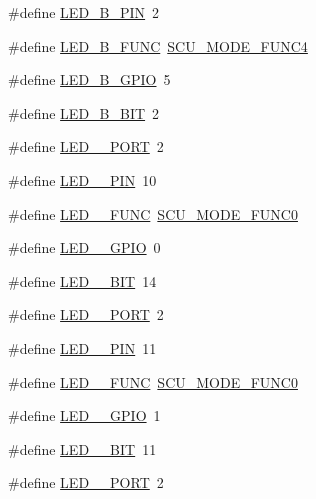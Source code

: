 \begin{DoxyCompactItemize}
\#define \hyperlink{group__samples_gac210a43d7fede956117cfb90baff9511}{L\+E\+D\+\_\+\+B\+\_\+\+P\+IN}~2
\item 
\#define \hyperlink{group__samples_ga9e3fbcc848cb89567f5a0a217030ddff}{L\+E\+D\+\_\+\+B\+\_\+\+F\+U\+NC}~\hyperlink{group___s_c_u__18_x_x__43_x_x_gaf1b58bdd83fd9b8331aaa1d54420a656}{S\+C\+U\+\_\+\+M\+O\+D\+E\+\_\+\+F\+U\+N\+C4}
\item 
\#define \hyperlink{group__samples_ga91901ef42fb89387a433e685cb3f8745}{L\+E\+D\+\_\+\+B\+\_\+\+G\+P\+IO}~5
\item 
\#define \hyperlink{group__samples_ga50b5b18af7a51f83133cb0ad51380c7d}{L\+E\+D\+\_\+\+B\+\_\+\+B\+IT}~2
\item 
\#define \hyperlink{group__samples_ga2367ab7af33710f8502250e8bd2c1dc0}{L\+E\+D\+\_\+\_\+\+P\+O\+RT}~2
\item 
\#define \hyperlink{group__samples_ga620741f492787e04779bab21e6658113}{L\+E\+D\+\_\+\_\+\+P\+IN}~10
\item 
\#define \hyperlink{group__samples_gaf4e0ca171c51b5c66dd6249d767bac5e}{L\+E\+D\+\_\+\_\+\+F\+U\+NC}~\hyperlink{group___s_c_u__18_x_x__43_x_x_gaec79b551b98008d8986e719926f254bc}{S\+C\+U\+\_\+\+M\+O\+D\+E\+\_\+\+F\+U\+N\+C0}
\item 
\#define \hyperlink{group__samples_ga37154c806d85fb9f9158f86bb55e9ee0}{L\+E\+D\+\_\+\_\+\+G\+P\+IO}~0
\item 
\#define \hyperlink{group__samples_ga3fe9954e37c14ff0232f26822e5df035}{L\+E\+D\+\_\+\_\+\+B\+IT}~14
\item 
\#define \hyperlink{group__samples_ga41f8586c0d98e483bba52f73e1a183b2}{L\+E\+D\+\_\+\_\+\+P\+O\+RT}~2
\item 
\#define \hyperlink{group__samples_ga78579f743b58c20ec8d10120d8381148}{L\+E\+D\+\_\+\_\+\+P\+IN}~11
\item 
\#define \hyperlink{group__samples_gaf7a6713ffe71577e7b394f5456b6dcea}{L\+E\+D\+\_\+\_\+\+F\+U\+NC}~\hyperlink{group___s_c_u__18_x_x__43_x_x_gaec79b551b98008d8986e719926f254bc}{S\+C\+U\+\_\+\+M\+O\+D\+E\+\_\+\+F\+U\+N\+C0}
\item 
\#define \hyperlink{group__samples_ga4285bdd58098064c3bab3976a78b26fa}{L\+E\+D\+\_\+\_\+\+G\+P\+IO}~1
\item 
\#define \hyperlink{group__samples_gaef7b45a64de5055d117ed11ec76ee9f5}{L\+E\+D\+\_\+\_\+\+B\+IT}~11
\item 
\#define \hyperlink{group__samples_gaaa65a4a427142f3ecdc5f1fe415d190c}{L\+E\+D\+\_\+\_\+\+P\+O\+RT}~2
\item 

\end{DoxyCompactItemize}
